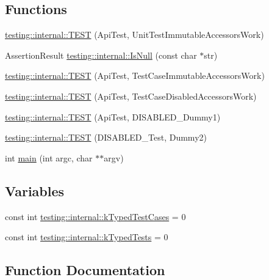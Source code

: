 \subsection*{Functions}
\begin{DoxyCompactItemize}
\item 
\hyperlink{namespacetesting_1_1internal_a9ac879683abb06d1c0bba3a339ea2f40}{testing\+::internal\+::\+T\+E\+ST} (Api\+Test, Unit\+Test\+Immutable\+Accessors\+Work)
\item 
Assertion\+Result \hyperlink{namespacetesting_1_1internal_adcfd37a66bc4cb0e8291cf46e1a6c72b}{testing\+::internal\+::\+Is\+Null} (const char $\ast$str)
\item 
\hyperlink{namespacetesting_1_1internal_a33809333fe5b5f33c2bd56ddcdd1dbb6}{testing\+::internal\+::\+T\+E\+ST} (Api\+Test, Test\+Case\+Immutable\+Accessors\+Work)
\item 
\hyperlink{namespacetesting_1_1internal_a459d693357db8f8f48c26a8bee3ffb84}{testing\+::internal\+::\+T\+E\+ST} (Api\+Test, Test\+Case\+Disabled\+Accessors\+Work)
\item 
\hyperlink{namespacetesting_1_1internal_a9ed5f89c92532506899e3908e79af4de}{testing\+::internal\+::\+T\+E\+ST} (Api\+Test, D\+I\+S\+A\+B\+L\+E\+D\+\_\+\+Dummy1)
\item 
\hyperlink{namespacetesting_1_1internal_a4a84433419426d1c1b87ce998267b0d4}{testing\+::internal\+::\+T\+E\+ST} (D\+I\+S\+A\+B\+L\+E\+D\+\_\+\+Test, Dummy2)
\item 
int \hyperlink{gtest-unittest-api__test_8cc_a3c04138a5bfe5d72780bb7e82a18e627}{main} (int argc, char $\ast$$\ast$argv)
\end{DoxyCompactItemize}
\subsection*{Variables}
\begin{DoxyCompactItemize}
\item 
const int \hyperlink{namespacetesting_1_1internal_a685ea5332074ae63b0ded2b184ac2271}{testing\+::internal\+::k\+Typed\+Test\+Cases} = 0
\item 
const int \hyperlink{namespacetesting_1_1internal_a53ee2d113744f9ba1d89469db4d7388b}{testing\+::internal\+::k\+Typed\+Tests} = 0
\end{DoxyCompactItemize}


\subsection{Function Documentation}
